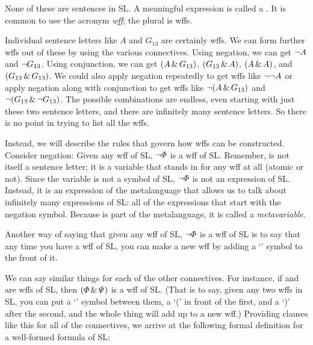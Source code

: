 None of these are sentences in SL. A meaningful expression is called a . It is common to use the acronym \emph{wff}; the plural is wffs.

Individual sentence letters like $A$ and $G_{13}$ are certainly wffs. We can form further wffs out of these by using the various connectives. Using negation, we can get $\neg A$ and $\neg G_{13}$. Using conjunction, we can get $(A \,\&\, G_{13})$, $(G_{13} \,\&\, A)$, $(A \,\&\, A)$, and $(G_{13} \,\&\, G_{13})$. We could also apply negation repeatedly to get wffs like $\neg \neg A$ or apply negation along with conjunction to get wffs like $\neg(A \,\&\, G_{13})$ and $\neg(G_{13} \,\&\, \neg G_{13})$. The possible combinations are endless, even starting with just these two sentence letters, and there are infinitely many sentence letters. So there is no point in trying to list all the wffs.

Instead, we will describe the rules that govern how wffs can be constructed. Consider negation: Given any wff \metaA{} of SL, $\neg\varPhi{}$ is a wff of SL. Remember, \metaA{} is not itself a sentence letter; it is a variable that stands in for any wff at all (atomic or not). Since the variable \metaA{} is not a symbol of SL, $\neg\varPhi{}$ is not an expression of SL. Instead, it is an expression of the metalanguage that allows us to talk about infinitely many expressions of SL: all of the expressions that start with the negation symbol. Because \metaA{} is part of the metalanguage, it is called a \emph{metavariable}.

Another way of saying that given any wff \metaA{} of SL, $\neg\varPhi{}$ is a wff of SL is to say that any time you have a wff of SL, you can make a new wff by adding a `\enot' symbol to the front of it.

We can say similar things for each of the other connectives. For instance, if \metaA{} and \metaB{} are wffs of SL, then $(\varPhi{}\,\&\,\varPsi{})$ is a wff of SL. (That is to say, given any two wffs in SL, you can put a `\eand' symbol between them, a `(' in front of the first, and a `)' after the second, and the whole thing will add up to a new wff.)  Providing clauses like this for all of the connectives, we arrive at the following formal definition for a {well-formed formula of SL}:

